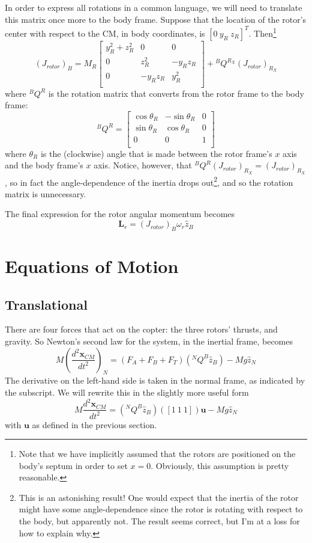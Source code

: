 \documentclass[10pt,letterpaper,final]{article}
\begin{document}
In order to express all rotations in a common language, we will need to translate this matrix once more to the body frame. Suppose that the location of the rotor's center with respect to the CM, in body coordinates, is $[0 \ y_R \ z_R]^T$. Then\footnote{Note that we have implicitly assumed that the rotors are positioned on the body's septum in order to set $x = 0$. Obviously, this assumption is pretty reasonable.}
$$(J_{rotor})_B = M_R \begin{bmatrix}
y_R^2 + z_R^2 & 0 & 0 \\
0 & z_R^2 & -y_Rz_R \\
0 & -y_Rz_R & y_R^2 \\
\end{bmatrix} + {}^BQ^{R_X} (J_{rotor})_{R_X}
$$
where $^BQ^R $ is the rotation matrix that converts from the rotor frame to the body frame:
$$
^BQ^R = \begin{bmatrix}
\cos\theta_R & -\sin\theta_R & 0 \\
\sin\theta_R & \cos\theta_R & 0 \\
0 & 0 & 1 \\
\end{bmatrix}
$$
where $\theta_R$ is the (clockwise) angle that is made between the rotor frame's $x$ axis and the body frame's $x$ axis. Notice, however, that $^BQ^R (J_{rotor})_{R_X} = (J_{rotor})_{R_X}$, so in fact the angle-dependence of the inertia drops out\footnote{This is an astonishing result! One would expect that the inertia of the rotor might have some angle-dependence since the rotor is rotating with respect to the body, but apparently not. The result seems correct, but I'm at a loss for how to explain why.}, and so the rotation matrix is unnecessary.

The final expression for the rotor angular momentum becomes
\begin{equation}
\bm{L}_{r} = (J_{rotor})_B \omega_{r} \hat{z}_B
\end{equation}

\section{Equations of Motion}
\subsection{Translational}
There are four forces that act on the copter: the three rotors' thrusts, and gravity. So Newton's second law for the system, in the inertial frame, becomes
\begin{equation}
M \left (\frac{d^2\bm{x}_{CM}}{dt^2} \right)_N = (F_A + F_B + F_T)(^N Q^B \hat{z}_B) - Mg\hat{z}_N
\end{equation}
The derivative on the left-hand side is taken in the normal frame, as indicated by the subscript. We will rewrite this in the slightly more useful form
\begin{equation}
M \frac{d^2\bm{x}_{CM}}{dt^2} = (^N Q^B \hat{z}_B)([1 \ 1 \ 1]) \bm{u} - Mg\hat{z}_N
\end{equation}
with $\bm u$ as defined in the previous section.
\end{document}
